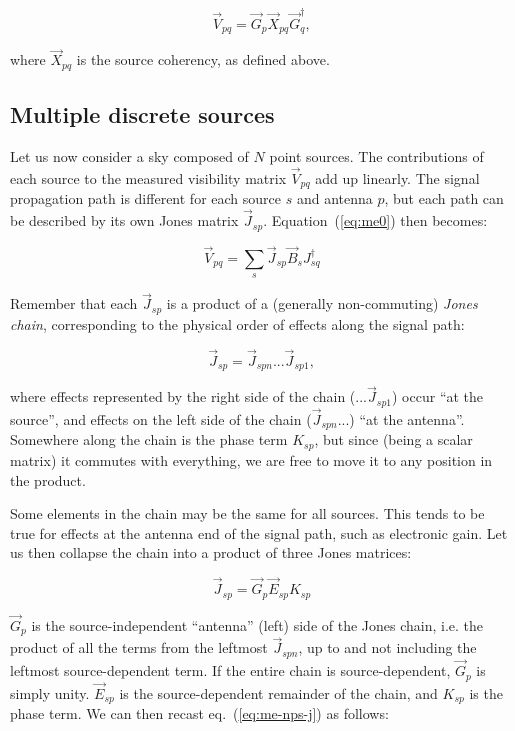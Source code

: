 \documentclass[]{aa}
\begin{document}
  \begin{equation}\label{eq:me-point-source-corrupted}
  \vec V_{pq} = \vec G_p \vec X_{pq} \vec G^\dagger_q,
  \end{equation}

where $\vec X_{pq}$ is the source coherency, as defined above.
 

\subsection{Multiple discrete sources}

Let us now consider a sky composed of $N$ point sources. The contributions of each source to the measured visibility matrix $\vec V_{pq}$ add up linearly. The signal propagation path is different for each source $s$ and antenna $p$, but each path can be described by its own Jones matrix $\vec J_{sp}$. Equation~(\ref{eq:me0}) then becomes:

  \begin{equation}\label{eq:me-nps-j}
  \vec V_{pq} = \sum_{s}{\vec J_{sp} \vec B_s J^\dagger_{sq}}
  \end{equation}

Remember that each $\vec J_{sp}$ is a product of a (generally non-commuting) {\em Jones chain}, corresponding to the physical order of effects along the signal path:

  \[
  \vec J_{sp} = \vec J_{spn} ... \vec J_{sp1},
  \]

where effects represented by the right side of the chain ($...\vec J_{sp1}$) occur ``at the source'', and effects on the left side of the chain ($\vec J_{spn}...$) ``at the antenna''. Somewhere along the chain is the phase term $K_{sp}$, but since (being a scalar matrix) it commutes with everything, we are free to move it to any position in the product.

Some elements in the chain may be the same for all sources. This tends to be true for effects at the antenna end of the signal path, such as electronic gain. Let us then collapse the chain into a product of three Jones matrices:

  \[
  \vec J_{sp} = \vec G_{p} \vec E_{sp} K_{sp}
  \]

$\vec G_{p}$ is the source-independent ``antenna'' (left) side of the Jones chain, i.e. the product of all the terms from the leftmost $\vec J_{spn}$, up to and not including the leftmost source-dependent term. If the entire chain is source-dependent, $\vec G_{p}$ is simply unity. $\vec E_{sp}$ is the source-dependent remainder of the chain, and $K_{sp}$ is the phase term. We can then recast eq.~(\ref{eq:me-nps-j}) as follows:
\end{document}
